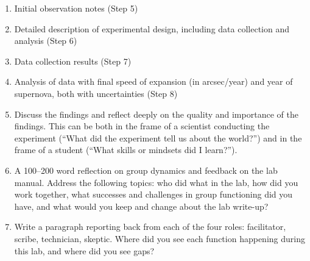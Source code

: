 \begin{enumerate}
	
	\item Initial observation notes (Step 5)
	
	\item Detailed description of experimental design, including data collection and analysis (Step 6)
	
	\item Data collection results (Step 7)
	
	\item Analysis of data with final speed of expansion (in arcsec/year) and year of supernova, both with uncertainties (Step 8)
	
	\item Discuss the findings and reflect deeply on the quality and importance of the findings. This can
	be both in the frame of a scientist conducting the experiment (“What did the experiment tell us
	about the world?”) and in the frame of a student (“What skills or mindsets did I learn?”).
	
	\item A 100–200 word reflection on group dynamics and feedback on the lab manual. Address the
	following topics: who did what in the lab, how did you work together, what successes and
	challenges in group functioning did you have, and what would you keep and change about the
	lab write-up?
	
	\item Write a paragraph reporting back from each of the four roles: facilitator, scribe, technician,
	skeptic. Where did you see each function happening during this lab, and where did you see
	gaps?
\end{enumerate}